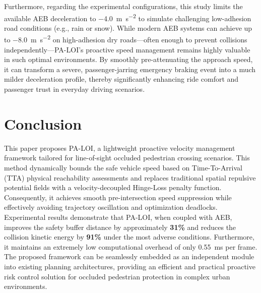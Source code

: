 \documentclass[letterpaper, 10 pt, conference]{ieeeconf}  %
\begin{document}
Furthermore, regarding the experimental configurations, this study limits the available AEB deceleration to \SI{-4.0}{\meter\per\second\squared} to simulate challenging low-adhesion road conditions (e.g., rain or snow). While modern AEB systems can achieve up to \SI{-8.0}{\meter\per\second\squared} on high-adhesion dry roads---often enough to prevent collisions independently---PA-LOI's proactive speed management remains highly valuable in such optimal environments. By smoothly pre-attenuating the approach speed, it can transform a severe, passenger-jarring emergency braking event into a much milder deceleration profile, thereby significantly enhancing ride comfort and passenger trust in everyday driving scenarios.

\section{Conclusion}

This paper proposes PA-LOI, a lightweight proactive velocity management framework tailored for line-of-sight occluded pedestrian crossing scenarios. This method dynamically bounds the safe vehicle speed based on Time-To-Arrival (TTA) physical reachability assessments and replaces traditional spatial repulsive potential fields with a velocity-decoupled Hinge-Loss penalty function. Consequently, it achieves smooth pre-intersection speed suppression while effectively avoiding trajectory oscillation and optimization deadlocks. Experimental results demonstrate that PA-LOI, when coupled with AEB, improves the safety buffer distance by approximately \textbf{31\%} and reduces the collision kinetic energy by \textbf{91\%} under the most adverse conditions. Furthermore, it maintains an extremely low computational overhead of only \SI{0.55}{\milli\second} per frame. The proposed framework can be seamlessly embedded as an independent module into existing planning architectures, providing an efficient and practical proactive risk control solution for occluded pedestrian protection in complex urban environments.

\end{document}
